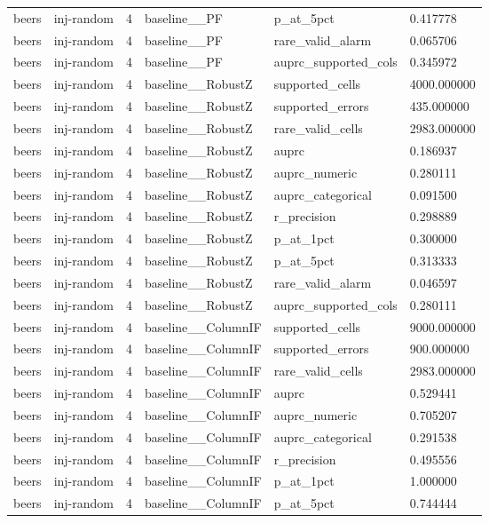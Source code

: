 \begin{tabular}{llllll}
beers & inj-random & 4 & baseline\_\_PF & p\_at\_5pct & 0.417778 \\
beers & inj-random & 4 & baseline\_\_PF & rare\_valid\_alarm & 0.065706 \\
beers & inj-random & 4 & baseline\_\_PF & auprc\_supported\_cols & 0.345972 \\
beers & inj-random & 4 & baseline\_\_RobustZ & supported\_cells & 4000.000000 \\
beers & inj-random & 4 & baseline\_\_RobustZ & supported\_errors & 435.000000 \\
beers & inj-random & 4 & baseline\_\_RobustZ & rare\_valid\_cells & 2983.000000 \\
beers & inj-random & 4 & baseline\_\_RobustZ & auprc & 0.186937 \\
beers & inj-random & 4 & baseline\_\_RobustZ & auprc\_numeric & 0.280111 \\
beers & inj-random & 4 & baseline\_\_RobustZ & auprc\_categorical & 0.091500 \\
beers & inj-random & 4 & baseline\_\_RobustZ & r\_precision & 0.298889 \\
beers & inj-random & 4 & baseline\_\_RobustZ & p\_at\_1pct & 0.300000 \\
beers & inj-random & 4 & baseline\_\_RobustZ & p\_at\_5pct & 0.313333 \\
beers & inj-random & 4 & baseline\_\_RobustZ & rare\_valid\_alarm & 0.046597 \\
beers & inj-random & 4 & baseline\_\_RobustZ & auprc\_supported\_cols & 0.280111 \\
beers & inj-random & 4 & baseline\_\_ColumnIF & supported\_cells & 9000.000000 \\
beers & inj-random & 4 & baseline\_\_ColumnIF & supported\_errors & 900.000000 \\
beers & inj-random & 4 & baseline\_\_ColumnIF & rare\_valid\_cells & 2983.000000 \\
beers & inj-random & 4 & baseline\_\_ColumnIF & auprc & 0.529441 \\
beers & inj-random & 4 & baseline\_\_ColumnIF & auprc\_numeric & 0.705207 \\
beers & inj-random & 4 & baseline\_\_ColumnIF & auprc\_categorical & 0.291538 \\
beers & inj-random & 4 & baseline\_\_ColumnIF & r\_precision & 0.495556 \\
beers & inj-random & 4 & baseline\_\_ColumnIF & p\_at\_1pct & 1.000000 \\
beers & inj-random & 4 & baseline\_\_ColumnIF & p\_at\_5pct & 0.744444 \\

\end{tabular}
